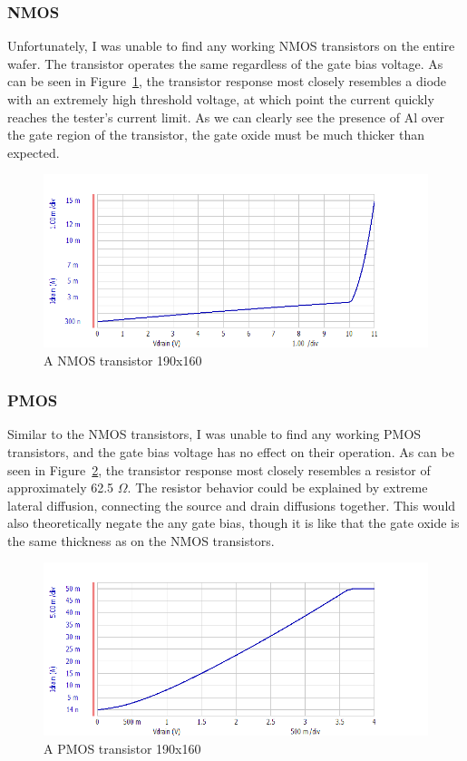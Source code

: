 \documentclass[letter,12pt]{article}
\begin{document}
		\FloatBarrier
		\subsubsection{NMOS}
			Unfortunately, I was unable to find any working NMOS transistors on the entire wafer.  The transistor operates the same regardless of the gate bias voltage.  As can be seen in Figure~\ref{fig:T_NMOS}, the transistor response most closely resembles a diode with an extremely high threshold voltage, at which point the current quickly reaches the tester's current limit. As we can clearly see the presence of Al over the gate region of the transistor, the gate oxide must be much thicker than expected.
			
			\begin{figure}[h!]
				\centering
				\includegraphics[width=\textwidth]{./Images/Probe_Test/T_NMOS_190x160E10.png}
				\caption{A NMOS transistor 190x160}
				\label{fig:T_NMOS}
			\end{figure}
		
		\FloatBarrier
		\subsubsection{PMOS}
			Similar to the NMOS transistors, I was unable to find any working PMOS transistors, and the gate bias voltage has no effect on their operation.  As can be seen in Figure~\ref{fig:T_PMOS}, the transistor response most closely resembles a resistor of approximately 62.5 $\Omega$. The resistor behavior could be explained by extreme lateral diffusion, connecting the source and drain diffusions together.  This would also theoretically negate the any gate bias, though it is like that the gate oxide is the same thickness as on the NMOS transistors.
			
			\begin{figure}[h!]
				\centering
				\includegraphics[width=\textwidth]{./Images/Probe_Test/T_PMOS_190x160E10.png}
				\caption{A PMOS transistor 190x160}
				\label{fig:T_PMOS}
			\end{figure}
			
\end{document}
